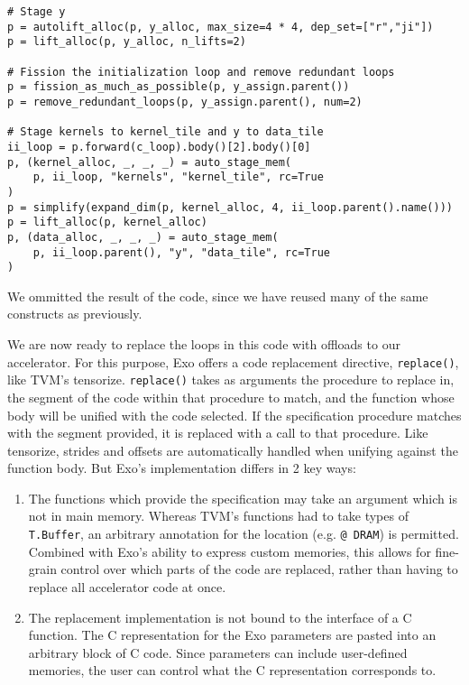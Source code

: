\documentclass[acmsmall, nonacm=true]{acmart}
\begin{document}
\begin{verbatim}
# Stage y
p = autolift_alloc(p, y_alloc, max_size=4 * 4, dep_set=["r","ji"])
p = lift_alloc(p, y_alloc, n_lifts=2)

# Fission the initialization loop and remove redundant loops
p = fission_as_much_as_possible(p, y_assign.parent())
p = remove_redundant_loops(p, y_assign.parent(), num=2)

# Stage kernels to kernel_tile and y to data_tile
ii_loop = p.forward(c_loop).body()[2].body()[0]
p, (kernel_alloc, _, _, _) = auto_stage_mem(
    p, ii_loop, "kernels", "kernel_tile", rc=True
)
p = simplify(expand_dim(p, kernel_alloc, 4, ii_loop.parent().name()))
p = lift_alloc(p, kernel_alloc)
p, (data_alloc, _, _, _) = auto_stage_mem(
    p, ii_loop.parent(), "y", "data_tile", rc=True
)
\end{verbatim}

We ommitted the result of the code, since we have reused many of the same constructs as previously.

We are now ready to replace the loops in this code with offloads to our accelerator. For this purpose, Exo offers a code replacement directive, \verb|replace()|, like TVM's tensorize. \verb|replace()| takes as arguments the procedure to replace in, the segment of the code within that procedure to match, and the function whose body will be unified with the code selected.  If the specification procedure matches with the segment provided, it is replaced with a call to that procedure. Like tensorize, strides and offsets are automatically handled when unifying against the function body. But Exo's implementation differs in 2 key ways:
\begin{enumerate}
    \item The functions which provide the specification may take an argument which is not in main memory. Whereas TVM's functions had to take types of \verb|T.Buffer|, an arbitrary annotation for the location (e.g. \verb|@ DRAM|) is permitted. Combined with Exo's ability to express custom memories, this allows for fine-grain control over which parts of the code are replaced, rather than having to replace all accelerator code at once. 
    \item The replacement implementation is not bound to the interface of a C function. The C representation for the Exo parameters are pasted into an arbitrary block of C code. Since parameters can include user-defined memories, the user can control what the C representation corresponds to.
\end{enumerate}
\end{document}
